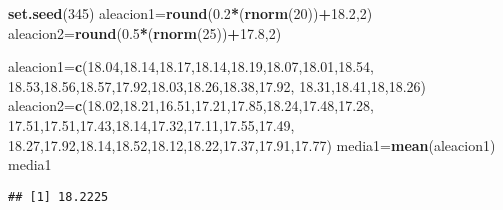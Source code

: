 \documentclass[
]{article}
\newenvironment{Shaded}{\begin{snugshade}}{\end{snugshade}}
\newcommand{\DecValTok}[1]{\textcolor[rgb]{0.00,0.00,0.81}{#1}}
\newcommand{\FloatTok}[1]{\textcolor[rgb]{0.00,0.00,0.81}{#1}}
\newcommand{\KeywordTok}[1]{\textcolor[rgb]{0.13,0.29,0.53}{\textbf{#1}}}
\newcommand{\NormalTok}[1]{#1}
\newcommand{\OperatorTok}[1]{\textcolor[rgb]{0.81,0.36,0.00}{\textbf{#1}}}
\begin{document}
\begin{Shaded}
\begin{Highlighting}[]
\KeywordTok{set.seed}\NormalTok{(}\DecValTok{345}\NormalTok{)}
\NormalTok{aleacion1=}\KeywordTok{round}\NormalTok{(}\FloatTok{0.2}\OperatorTok{*}\NormalTok{(}\KeywordTok{rnorm}\NormalTok{(}\DecValTok{20}\NormalTok{))}\OperatorTok{+}\FloatTok{18.2}\NormalTok{,}\DecValTok{2}\NormalTok{)}
\NormalTok{aleacion2=}\KeywordTok{round}\NormalTok{(}\FloatTok{0.5}\OperatorTok{*}\NormalTok{(}\KeywordTok{rnorm}\NormalTok{(}\DecValTok{25}\NormalTok{))}\OperatorTok{+}\FloatTok{17.8}\NormalTok{,}\DecValTok{2}\NormalTok{)}
\end{Highlighting}
\end{Shaded}

\begin{Shaded}
\begin{Highlighting}[]
\NormalTok{aleacion1=}\KeywordTok{c}\NormalTok{(}\FloatTok{18.04}\NormalTok{,}\FloatTok{18.14}\NormalTok{,}\FloatTok{18.17}\NormalTok{,}\FloatTok{18.14}\NormalTok{,}\FloatTok{18.19}\NormalTok{,}\FloatTok{18.07}\NormalTok{,}\FloatTok{18.01}\NormalTok{,}\FloatTok{18.54}\NormalTok{,}
            \FloatTok{18.53}\NormalTok{,}\FloatTok{18.56}\NormalTok{,}\FloatTok{18.57}\NormalTok{,}\FloatTok{17.92}\NormalTok{,}\FloatTok{18.03}\NormalTok{,}\FloatTok{18.26}\NormalTok{,}\FloatTok{18.38}\NormalTok{,}\FloatTok{17.92}\NormalTok{,}
            \FloatTok{18.31}\NormalTok{,}\FloatTok{18.41}\NormalTok{,}\DecValTok{18}\NormalTok{,}\FloatTok{18.26}\NormalTok{)}
\NormalTok{aleacion2=}\KeywordTok{c}\NormalTok{(}\FloatTok{18.02}\NormalTok{,}\FloatTok{18.21}\NormalTok{,}\FloatTok{16.51}\NormalTok{,}\FloatTok{17.21}\NormalTok{,}\FloatTok{17.85}\NormalTok{,}\FloatTok{18.24}\NormalTok{,}\FloatTok{17.48}\NormalTok{,}\FloatTok{17.28}\NormalTok{,}
            \FloatTok{17.51}\NormalTok{,}\FloatTok{17.51}\NormalTok{,}\FloatTok{17.43}\NormalTok{,}\FloatTok{18.14}\NormalTok{,}\FloatTok{17.32}\NormalTok{,}\FloatTok{17.11}\NormalTok{,}\FloatTok{17.55}\NormalTok{,}\FloatTok{17.49}\NormalTok{,}
            \FloatTok{18.27}\NormalTok{,}\FloatTok{17.92}\NormalTok{,}\FloatTok{18.14}\NormalTok{,}\FloatTok{18.52}\NormalTok{,}\FloatTok{18.12}\NormalTok{,}\FloatTok{18.22}\NormalTok{,}\FloatTok{17.37}\NormalTok{,}\FloatTok{17.91}\NormalTok{,}\FloatTok{17.77}\NormalTok{)}
\NormalTok{media1=}\KeywordTok{mean}\NormalTok{(aleacion1)}
\NormalTok{media1}
\end{Highlighting}
\end{Shaded}

\begin{verbatim}
## [1] 18.2225
\end{verbatim}
\end{document}
